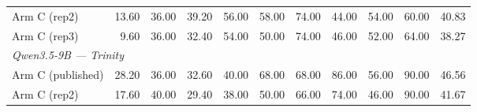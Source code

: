 \begin{table}[t]
{\begin{tabular}{lrrrrrrrrrr}
Arm C (rep2) & 13.60 & 36.00 & 39.20 & 56.00 & 58.00 & 74.00 & 44.00 & 54.00 & 60.00 & 40.83 \\
Arm C (rep3) & 9.60 & 36.00 & 32.40 & 54.00 & 50.00 & 74.00 & 46.00 & 52.00 & 64.00 & 38.27 \\
\midrule
\multicolumn{11}{l}{\textit{Qwen3.5-9B --- Trinity}} \\
Arm C (published) & 28.20 & 36.00 & 32.60 & 40.00 & 68.00 & 68.00 & 86.00 & 56.00 & 90.00 & 46.56 \\
Arm C (rep2) & 17.60 & 40.00 & 29.40 & 38.00 & 50.00 & 66.00 & 74.00 & 46.00 & 90.00 & 41.67 \\
\bottomrule
\end{tabular}%
}
\end{table}
